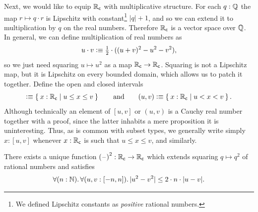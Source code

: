 %
Next, we would like to equip $\mathbb{R}_\mathsf{c}$ with multiplicative structure. For each $q : \mathbb{Q}$ the
map $r \mapsto q \cdot r$ is Lipschitz with constant\footnote{We defined Lipschitz
  constants as \emph{positive} rational numbers.} $|q| + 1$, and so we can extend it to
multiplication by $q$ on the real numbers. Therefore $\mathbb{R}_\mathsf{c}$ is a vector space over $\mathbb{Q}$.
In general, we can define multiplication of real numbers as
%
\begin{equation}
  u \cdot v \vcentcolon\equiv
  {\textstyle \frac{1}{2}} \cdot ((u + v)^2 - u^2 - v^2),\label{mult-from-square}
\end{equation}
%
so we just need squaring $u \mapsto u^2$ as a map $\mathbb{R}_\mathsf{c} \to \mathbb{R}_\mathsf{c}$. Squaring is not a
Lipschitz map, but it is Lipschitz on every bounded domain, which allows us to patch it
together. Define the open and closed intervals
%
%
%
%
\begin{equation*}
  [u,v] \defeq \setof{ x : \RC | u \leq x \leq v }
  \qquad\text{and}\qquad
  (u,v) \defeq \setof{ x : \RC | u < x < v }.
\end{equation*}
%
Although technically an element of $[u,v]$ or $(u,v)$ is a Cauchy real number together with a proof, since the latter inhabits a mere proposition it is uninteresting.
Thus, as is common with subset types, we generally write simply $x:[u,v]$ whenever $x:\mathbb{R}_\mathsf{c}$ is such that $u\leq x \leq v$, and similarly.

\begin{thm} \label{RC-squaring}
  There exists a unique function ${(\mathord{\hspace{1pt}\text{--}\hspace{1pt}})}^2 : \mathbb{R}_\mathsf{c} \to \mathbb{R}_\mathsf{c}$ which extends squaring $q \mapsto
  q^2$ of rational numbers and satisfies
  \begin{equation*}
    \fall{n : \N}
    \fall{u, v : [-n, n]}
    |u^2 - v^2| \leq 2 \cdot n \cdot |u - v|.
  \end{equation*}
\end{thm}

